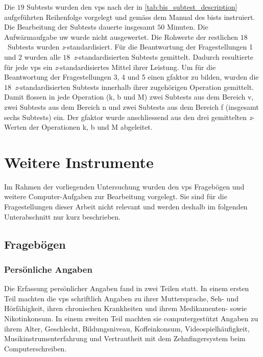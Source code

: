 \documentclass[11pt, twoside, a4paper]{book}		%
\begin{document}
Die $19$ Subtests wurden den \glspl{vp} nach der in \autoref{tab:bis_subtest_description} aufgeführten Reihenfolge vorgelegt und gemäss dem Manual des \gls{bist}s instruiert. 
Die Bearbeitung der Subtests dauerte insgesamt $50$ Minuten.
Die Aufwärmaufgabe \gls{uw} wurde nicht ausgewertet. Die Rohwerte der restlichen $18$~Subtests wurden \textit{z}-standardisiert. 
Für die Beantwortung der Fragestellungen 1 und 2 wurden alle $18$~\textit{z}-standardisierten Subtests gemittelt. Dadurch resultierte für jede \glspl{vp} ein \textit{z}-standardisiertes Mittel ihrer Leistung. 
Um für die Beantwortung der Fragestellungen 3, 4 und 5 einen \gls{gfaktor} zu bilden, wurden die $18$~\textit{z}-standardisierten Subtests innerhalb ihrer zugehörigen Operation gemittelt. Damit flossen in jede Operation (\gls{k}, \gls{b} und \gls{M}) zwei Subtests aus dem Bereich \gls{v}, zwei Subtests aus dem Bereich \gls{n} und zwei Subtests aus dem Bereich \gls{f} (insgesamt sechs Subtests) ein. Der \gls{gfaktor} wurde anschliessend aus den drei gemittelten \textit{z}-Werten der Operationen \gls{k}, \gls{b} und \gls{M} abgeleitet.


\section{Weitere Instrumente}

Im Rahmen der vorliegenden Untersuchung wurden den \glspl{vp} Fragebögen und weitere Com\-put\-er-Auf\-gaben zur Bearbeitung vorgelegt. Sie sind für die Fragestellungen dieser Arbeit nicht relevant und werden deshalb im folgenden Unterabschnitt nur kurz beschrieben.


\subsection{Fragebögen}

\subsubsection*{Persönliche Angaben}
Die Erfassung persönlicher Angaben fand in zwei Teilen statt. In einem ersten Teil machten die \glspl{vp} schriftlich Angaben zu ihrer Muttersprache, Seh- und Hörfähigkeit, ihren chronischen Krankheiten und ihrem Medikamenten- sowie Nikotinkonsum. In einem zweiten Teil machten sie computergestützt Angaben zu ihrem Alter, Geschlecht, Bildungsniveau, Koffeinkonsum,  Videospielhäufigkeit, Musikinstrumenterfahrung und Vertrautheit mit dem Zehnfingersystem beim Computerschreiben.
\end{document}
